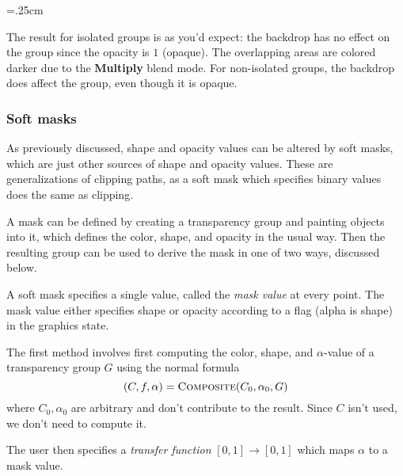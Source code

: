 \bigskip
\centerline{\vbox{\tabskip=.25cm\jot{}}}
\bigskip

The result for isolated groups is as you'd expect: the backdrop has no effect on the group since the opacity
is $1$ (opaque).
The overlapping areas are colored darker due to the {\bf Multiply} blend mode.
For non-isolated groups, the backdrop does affect the group, even though it is opaque.

\egroup

\subsubsection{Soft masks}

As previously discussed, shape and opacity values can be altered by soft masks, which are just other sources
of shape and opacity values.
These are generalizations of clipping paths, as a soft mask which specifies binary values does the same as
clipping.

A mask can be defined by creating a transparency group and painting objects into it, which defines the color,
shape, and opacity in the usual way.
Then the resulting group can be used to derive the mask in one of two ways, discussed below.

A soft mask specifies a single value, called the {\it mask value} at every point.
The mask value either specifies shape or opacity according to a flag (alpha is shape) in the graphics state.


The first method involves first computing the color, shape, and $\alpha$-value of a transparency group $G$
using the normal formula
$$ (C,f,\alpha) = \hbox{\sc Composite}(C_0,\alpha_0,G) $$
where $C_0,\alpha_0$ are arbitrary and don't contribute to the result.
Since $C$ isn't used, we don't need to compute it.

The user then specifies a {\it transfer function} $[0,1]\to[0,1]$ which maps $\alpha$ to a mask value.


